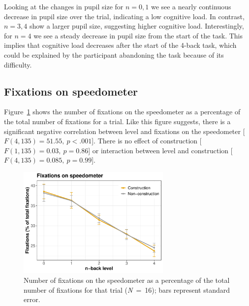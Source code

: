 Looking at the changes in pupil size for \(n = 0,1\) we see a nearly continuous decrease in pupil size over the trial, indicating a low cognitive load.
In contrast, \(n=3,4\) show a larger pupil size, suggesting higher cognitive load.
Interestingly, for \(n=4\) we see a steady decrease in pupil size from the start of the \nback task. 
This implies that cognitive load decreases after the start of the 4-back task, which could be explained by the participant abandoning the task because of its difficulty. 

\subsection{Fixations on speedometer}
Figure~\ref{fig:fix-speedometer} shows the number of fixations on the speedometer as a percentage of the total number of fixations for a trial.
Like this figure suggests, there is a significant negative correlation between \nback level and fixations on the speedometer [\(F(4,135)=51.55,\ p<.001\)].
There is no effect of construction [\(F(1,135)=0.03,\ p=0.86\)] or interaction between \nback level and construction [\(F(4,135)=0.085,\ p=0.99\)]. 

\begin{figure}
  \centering
  \includegraphics[width=7.5cm]{images/speedometer_interaction.pdf}
  \caption{Number of fixations on the speedometer as a percentage of the total number of fixations for that trial (\textit{N}\ =\ 16); bars represent standard error.}
  \label{fig:fix-speedometer}
\end{figure}
